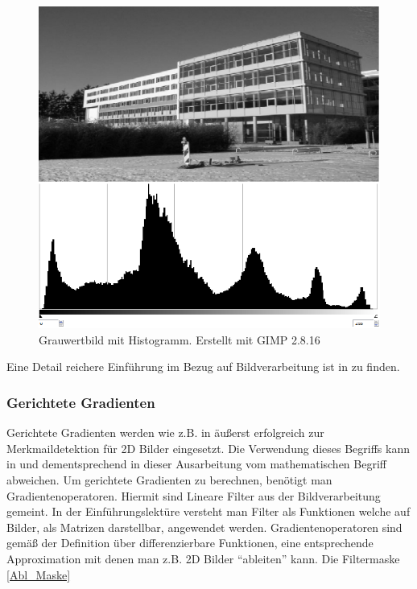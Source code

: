 \begin{figure}[thpb]
	\centering
	\includegraphics[width=\linewidth]{1-Einleitung/pics/pic_histo_uni01.png}
	\caption{Grauwertbild mit Histogramm. Erstellt mit GIMP 2.8.16}
	\label{SHREC_3DHOG_DSR472}
\end{figure}



Eine Detail reichere Einführung im Bezug auf Bildverarbeitung ist in \cite{Priese15} zu finden.

\subsubsection{Gerichtete Gradienten}
Gerichtete Gradienten werden wie z.B. in \cite{dalal2005histograms} äußerst erfolgreich zur Merkmaildetektion für 2D Bilder eingesetzt. Die Verwendung dieses Begriffs kann in \cite{scherer2010histograms} und dementsprechend in dieser Ausarbeitung vom mathematischen Begriff abweichen.
\newline
Um gerichtete Gradienten zu berechnen, benötigt man Gradientenoperatoren. Hiermit sind Lineare Filter aus der Bildverarbeitung gemeint. In der Einführungslektüre \cite{Priese15} versteht man Filter als Funktionen welche auf Bilder, als Matrizen darstellbar, angewendet werden. Gradientenoperatoren sind gemäß der Definition über differenzierbare Funktionen, eine entsprechende Approximation mit denen man z.B. 2D Bilder "`ableiten"' kann. Die Filtermaske \ref{Abl_Maske} 

